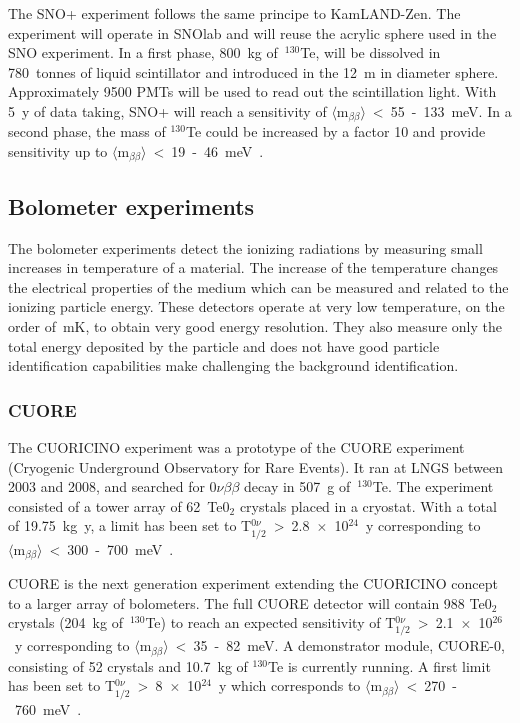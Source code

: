 \documentclass[main.tex]{subfiles}
\begin{document}
\NI The SNO+ experiment follows the same principe to KamLAND-Zen. The experiment will operate in SNOlab and will reuse the acrylic sphere used in the SNO experiment. In a first phase, 800~kg of~$^{\text{130}}$Te, will be dissolved in 780~tonnes of liquid scintillator and introduced in the 12~m in diameter sphere. Approximately 9500 PMTs will be used to read out the scintillation light. With 5~y of data taking, SNO+ will reach a sensitivity of $\langle \text{m}_{\beta\beta} \rangle$~<~55~-~133~meV. In a second phase, the mass of $^{\text{130}}$Te could be increased by a factor 10 and provide sensitivity up to  $\langle \text{m}_{\beta\beta} \rangle$~<~19~-~46~meV~\cite{SNO+}.


\subsection{Bolometer experiments}


\NI The bolometer experiments detect the ionizing radiations by measuring small increases in temperature of a material. The increase of the temperature changes the electrical properties of the medium which can be measured and related to the ionizing particle energy. These detectors operate at very low temperature, on the order of~mK, to obtain very good energy resolution. They also measure only the total energy deposited by the particle and does not have good particle identification capabilities make challenging the background identification.


\subsubsection{CUORE}


\NI The CUORICINO experiment was a prototype of the CUORE experiment (Cryogenic Underground Observatory for Rare Events). It ran at LNGS between 2003 and 2008, and searched for 0$\nu\beta\beta$ decay in 507~g of~$^{\text{130}}$Te.  The experiment consisted of a tower array of 62~Te0$_\text{2}$ crystals placed in a cryostat. With a total of 19.75~kg~y, a limit has been set to T$_{\text{1/2}}^{0\nu}$~>~2.8~$\times$~10$^{\text{24}}$~y corresponding to $\langle \text{m}_{\beta\beta} \rangle$~<~300~-~700~meV~\cite{CUORICINO}.


\bigskip


\NI CUORE is the next generation experiment extending the CUORICINO concept to a larger array of bolometers. The full CUORE detector will contain 988 Te0$_\text{2}$ crystals (204~kg of~$^{\text{130}}$Te) to reach an expected sensitivity of T$_{\text{1/2}}^{0\nu}$~>~2.1~$\times$~10$^{\text{26}}$~y corresponding to $\langle \text{m}_{\beta\beta} \rangle$~<~35~-~82~meV. A demonstrator module, CUORE-0, consisting of 52 crystals and 10.7~kg of $^{\text{130}}$Te is currently running. A first limit has been set to T$_{\text{1/2}}^{0\nu}$~>~8~$\times$~10$^{\text{24}}$~y which corresponds to $\langle \text{m}_{\beta\beta} \rangle$~<~270~-~760~meV~\cite{CUORE}.
\end{document}
